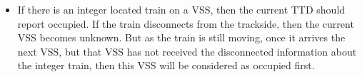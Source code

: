 \documentclass[article,dr=phil,type=msc,colorback,accentcolor=tud9c]{tudthesis}
\begin{document}
\begin{itemize}
\begin{itemize}
		\item 
		
		If there is an integer located train on a VSS, then the current TTD should report occupied. If the train disconnects from the trackside, then the current VSS becomes unknown. But as the train is still moving, once it arrives the next VSS, but that VSS has not received the disconnected information about the integer train, then this VSS will be considered as occupied first.
		
	\end{itemize}
	
  \end{itemize}

\renewcommand\refname{Reference}


\end{document}
